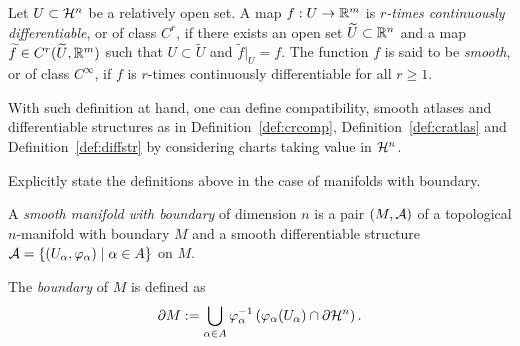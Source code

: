 \begin{definition}
	Let $U\subset\mathcal{H}^n$ be a relatively open set. A map $f: U\to\mathbb{R}^m$ is \emph{$r$-times continuously differentiable}, or of class $C^r$, if there exists an open set $\widetilde U\subset\mathbb{R}^n$ and a map $\widetilde f\in C^r(\widetilde U, \mathbb{R}^m)$ such that $U\subset\widetilde U$ and $\widetilde f|_U = f$.
	The function $f$ is said to be \emph{smooth}, or of class $C^\infty$, if $f$ is $r$-times continuously differentiable for all $r\geq 1$.
\end{definition}

With such definition at hand, one can define compatibility, smooth atlases and differentiable structures as in Definition~\ref{def:crcomp}, Definition~\ref{def:cratlas} and Definition~\ref{def:diffstr} by considering charts taking value in $\mathcal{H}^n$.

\begin{exercise}
	Explicitly state the definitions above in the case of manifolds with boundary.
\end{exercise}

\begin{definition}\label{def:diffmanifoldwb}
	A \emph{smooth manifold with boundary} of dimension $n$ is a pair $(M, \mathcal{A})$ of a topological $n$-manifold with boundary $M$ and a smooth differentiable structure $\mathcal{A} = \{(U_\alpha, \varphi_\alpha) \mid \alpha\in A\}$ on $M$.

	The \emph{boundary} of $M$ is defined as
	\begin{equation}\label{def:bdry}
		\partial M := \bigcup_{\alpha\in A} \varphi_\alpha^{-1}\left(\varphi_\alpha(U_\alpha)\cap \partial\mathcal{H}^n\right).
	\end{equation}
\end{definition}


